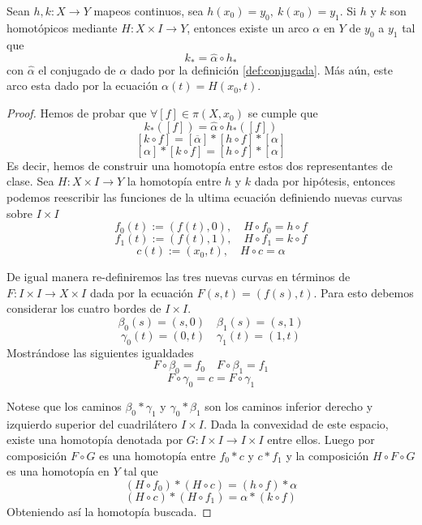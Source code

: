 \begin{lema} \label{lem:equiv-hom-lift}
  Sean \(h,k : X \to Y\) mapeos continuos, sea \(h (x_0) = y_0,\ k(x_0)
  = y_1\). Si \(h\) y \(k\) son homotópicos mediante \(H : X \times I
  \to Y\), entonces existe un arco \(\alpha\) en \(Y\) de \(y_0\) a
  \(y_1\) tal que
  \[k_* = \hat \alpha \circ h_* \]
  con \(\hat \alpha\) el conjugado de \(\alpha\) dado por la definición
  \ref{def:conjugada}. Más aún, este arco esta dado por la ecuación
  \(\alpha (t) = H (x_0, t)\).
\end{lema}
\begin{proof}
  Hemos de probar que \(\forall [f] \in \pi (X, x_0)\) se cumple que
  \[ k_* ([f]) = \hat \alpha \circ h_* ([f]) \]
  \[ [k \circ f] = [ \overline{\alpha} ] *  [h \circ f] * [\alpha] \]
  \[ [ \alpha ] * [k \circ f] =  [h \circ f] * [\alpha] \]
  Es decir, hemos de construir una homotopía entre estos dos
  representantes de clase. Sea \(H : X \times I \to Y\) la homotopía
  entre \(h\) y \(k\) dada por hipótesis, entonces podemos reescribir
  las funciones de la ultima ecuación definiendo nuevas curvas sobre \(I
  \times I\)
  \[ f_0(t) := \left( f(t), 0 \right), \quad H \circ f_0 = h \circ f \]
  \[ f_1(t) := \left( f(t), 1 \right), \quad H \circ f_1 = k \circ f \]
  \[ c(t) := (x_0, t), \quad H \circ c = \alpha \]

  De igual manera re-definiremos las tres nuevas curvas en términos de
  \(F : I \times I \to X \times I\) dada por la ecuación \(F(s,t) =
  (f(s),t)\). Para esto debemos considerar los cuatro bordes de
  \(I \times I\).
  \[ \beta_0(s) = (s, 0) \quad \beta_1(s) = (s, 1)\]
  \[ \gamma_0(t) = (0, t) \quad \gamma_1(t) = (1, t)\]
  Mostrándose las siguientes igualdades
  \[ F \circ \beta_0 = f_0 \quad F \circ \beta_1 = f_1\]
  \[ F \circ \gamma_0 = c = F \circ \gamma_1 \]

  Notese que los caminos \(\beta_0 * \gamma_1\) y \(\gamma_0 * \beta_1\)
  son los caminos inferior derecho y izquierdo superior del cuadrilátero
  \(I \times I\). Dada la convexidad de este espacio, existe una
  homotopía denotada por \(G : I \times I \to I \times I \) entre ellos.
  Luego por composición \(F \circ G\) es una homotopía entre \(f_0 * c\) y
  \(c * f_1\) y la composición \(H \circ F \circ G\) es una homotopía en
  \(Y\) tal que
  \[ (H \circ f_0) * (H \circ c) = (h \circ f) * \alpha \]
  \[ (H \circ c) * (H \circ f_1) = \alpha * (k \circ f) \]
  Obteniendo así la homotopía buscada.
\end{proof}


